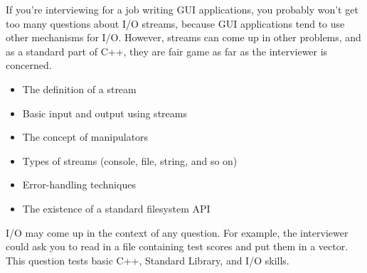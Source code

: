 
If you’re interviewing for a job writing GUI applications, you probably won’t get too many questions about I/O streams, because GUI applications tend to use other mechanisms for I/O. However, streams can come up in other problems, and as a standard part of C++, they are fair game as far as the interviewer is concerned.


\begin{itemize}
\item
The definition of a stream

\item
Basic input and output using streams

\item
The concept of manipulators

\item
Types of streams (console, file, string, and so on)

\item
Error-handling techniques

\item
The existence of a standard filesystem API
\end{itemize}


I/O may come up in the context of any question. For example, the interviewer could ask you to read in a file containing test scores and put them in a vector. This question tests basic C++, Standard Library, and I/O skills.

